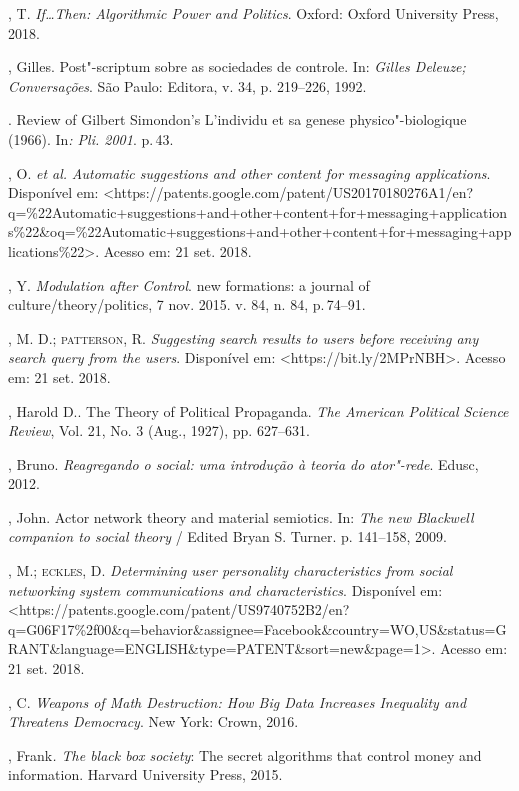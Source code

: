 \begin{bibliohedra}
, T. \emph{If\ldots{}Then: Algorithmic Power and Politics}. Oxford:
Oxford University Press, 2018.

, Gilles. Post"-scriptum sobre as sociedades de controle. In:
\emph{Gilles Deleuze; Conversações}. São Paulo: Editora, v. 34, p.
219--226, 1992.

\titidem. Review of Gilbert Simondon's L'individu et sa
genese physico"-biologique (1966). In\emph{: Pli. 2001}. p.\,43.

, O. \emph{et al.} \emph{Automatic suggestions and other
content for messaging applications}. Disponível em:
\textless{}https://patents.google.com/patent/US20170180276A1/en?q=\%22Automatic+suggestions+and+other+content+for+messaging+applications\%22\&oq=\%22Automatic+suggestions+and+other+content+for+messaging+applications\%22\textgreater{}.
Acesso em: 21 set. 2018.

, Y. \emph{Modulation after Control}. new formations: a journal of
culture/theory/politics, 7 nov. 2015. v. 84, n. 84, p.\,74--91.

, M. D.; \textsc{patterson}, R. \emph{Suggesting search results to users
before receiving any search query from the users}. Disponível em:
\textless{}https://bit.ly/2MPrNBH\textgreater{}.
Acesso em: 21 set. 2018.

, Harold D.. The Theory of Political Propaganda. \emph{The
American Political Science Review}, Vol. 21, No. 3 (Aug., 1927), pp.
627--631.

, Bruno. \emph{Reagregando o social: uma introdução à teoria do
ator"-rede}. Edusc, 2012.

, John. Actor network theory and material semiotics. In: \emph{The
new Blackwell companion to social theory} / Edited Bryan S. Turner. p.
141--158, 2009.

, M.; \textsc{eckles}, D. \emph{Determining user personality
characteristics from social networking system communications and
characteristics}. Disponível em:
\textless{}https://patents.google.com/patent/US9740752B2/en?q=G06F17\%2f00\&q=behavior\&assignee=Facebook\&country=WO,US\&status=GRANT\&language=ENGLISH\&type=PATENT\&sort=new\&page=1\textgreater{}.
Acesso em: 21 set. 2018.

, C. \emph{Weapons of Math Destruction: How Big Data Increases
Inequality and Threatens Democracy}. New York: Crown, 2016.

, Frank\emph{. The black box society}: The secret algorithms
that control money and information. Harvard University Press, 2015.


\end{bibliohedra}
